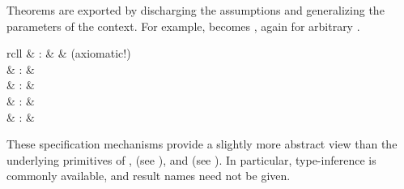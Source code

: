 \begin{isabellebody}
\begin{isamarkuptext}
  Theorems are exported by discharging the assumptions and
  generalizing the parameters of the context.  For example,  becomes , again for arbitrary
  .%
\end{isamarkuptext}%
\isamarkuptrue%
%
\isamarkuptrue%
%
\begin{isamarkuptext}%
\begin{matharray}{rcll}
    \hypertarget{command.axiomatization}{\hyperlink{command.axiomatization}{\mbox{}}} & : &  & (axiomatic!)\\
    \hypertarget{command.definition}{\hyperlink{command.definition}{\mbox{}}} & : &  \\
    \hypertarget{attribute.defn}{\hyperlink{attribute.defn}{\mbox{}}} & : &  \\
    \hypertarget{command.abbreviation}{\hyperlink{command.abbreviation}{\mbox{}}} & : &  \\
    \hypertarget{command.print-abbrevs}{\hyperlink{command.print-abbrevs}{\mbox{}}}\isa{{\isachardoublequote}\isactrlsup {\isacharasterisk}{\isachardoublequote}} & : &  \\
  \end{matharray}

  These specification mechanisms provide a slightly more abstract view
  than the underlying primitives of \hyperlink{command.consts}{\mbox{}}, \hyperlink{command.defs}{\mbox{}} (see ), and \hyperlink{command.axioms}{\mbox{}} (see
  ).  In particular, type-inference is commonly
  available, and result names need not be given.


\end{isamarkuptext}
\end{isabellebody}
